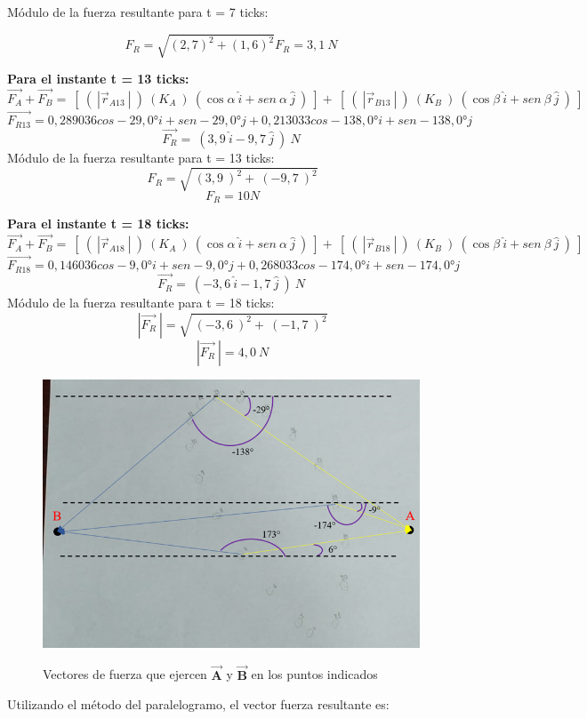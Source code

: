 \documentclass[../main.tex]{subfiles}
\begin{document}
Módulo de la fuerza resultante para t = 7 ticks:

\begin{equation*}
    F_R = \sqrt{(2,7)^2 + (1,6)^2}
    F_R = 3,1\ N
\end{equation*}

\textbf{Para el instante t = 13 ticks:}
\[\vec{F_A}+\vec{F_B}=\ [\ (\ |{\vec{r}}_{A13}\ |\ )\ (K_A\ )\ (\cos{\alpha}\ \hat{i}+sen\ \alpha\ \hat{j}\ )\ ]+\ [\ (\ |{\vec{r}}_{B13}\ |\ )\ (K_B\ )\ (\cos{\beta}\ \hat{i}+sen\ \beta\ \hat{j}\ )\ ]\]
\[\vec{F_{R13}}=0,289036cos-29,0°i+sen-29,0° j+0,213033cos-138,0°i+sen-138,0° j\]
\[\vec{F_R}=\ (3,9\ \hat{i}-9,7\ \hat{j}\ )\ N\]
Módulo de la fuerza resultante para t = 13   ticks:
\[\ F_R = \sqrt{\ (3,9\ )^2+\ (-9,7\ )^2}\]
\[\ F_R =10 N\]


\textbf{Para el instante t = 18 ticks:}
\[\vec{F_A}+\vec{F_B}=\ [\ (\ |{\vec{r}}_{A18}\ |\ )\ 
(K_A\ )\ (\cos{\alpha}\ \hat{i}+sen\ \alpha\ \hat{j}\ )\ ]+\ [\ (\ |{\vec{r}}_{B18}\ |\ )\ (K_B\ )\ (\cos{\beta}\ \hat{i}+sen\ \beta\ \hat{j}\ )\ ]\]
\[\vec{F_{R18}}=0,146036cos-9,0° i+sen-9,0° j+0,268033cos-174,0° i+sen-174,0° j \]
\[\vec{F_R}=\ (-3,6\ \hat{i}-1,7\ \hat{j}\ )\ N\]
Módulo de la fuerza resultante para t = 18 ticks:
\[\ |\vec{F_R}\ |=\sqrt{\ (-3,6\ )^2+\ (-1,7\ )^2}\]
\[\ |\vec{F_R}\ |=4,0\ N\]

\begin{figure}[H]
    \centering
    \includegraphics[width=0.8\linewidth]{images/calc3.png}
    \label{ref:calc3}
    \caption{Vectores de fuerza que ejercen $\vec{\mathbf{A}}$ y $\vec{\mathbf{B}}$ en los puntos indicados}
\end{figure}

Utilizando el método del paralelogramo, el vector fuerza resultante es: 
\end{document}
